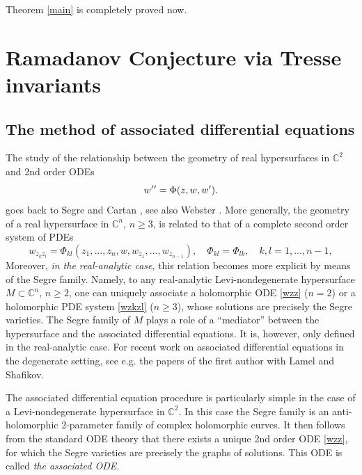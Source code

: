 \documentclass[12pt]{amsart}
\def\CC{\mathbb{C}}
\begin{document}
Theorem \ref{main} is completely proved now.

\section{Ramadanov Conjecture via Tresse invariants}

 \subsection{The method of associated differential equations}
 The study of the relationship between the geometry of 
 real hypersurfaces in $\CC^{2}$ and 2nd order ODEs 
  \begin{equation}\label{wzz}
 w\rq{}\rq{}=\Phi(z,w,w\rq{}).
 \end{equation}
 goes back to Segre \cite{segre}
 and Cartan \cite{cartan},
 see also Webster \cite{webster}.
More generally,  the geometry of a real hypersurface in $\CC^{n},\,n\geq 3$, is related to
 that of a complete second order system of PDEs
\begin{equation}\label{wzkzl}
w_{z_kz_l}=\Phi_{kl}(z_1,...,z_n,w,w_{z_1},...,w_{z_{n-1}}),\quad \Phi_{kl}=\Phi_{lk},\quad k,l=1,...,n-1,
\end{equation}
  Moreover, {\em in the real-analytic case},
  this relation becomes %
more
explicit 
by means of the Segre family.
Namely,
to any real-analytic Levi-nondegenerate hypersurface $M\subset\CC^{n},\,n\geq 2$, one can uniquely associate a holomorphic ODE \eqref{wzz} ($n=2$) or a holomorphic PDE system \eqref{wzkzl} ($n\geq 3$),
whose solutions are precisely the Segre varieties.
The Segre family of $M$ plays a role of a 
``mediator'' between the hypersurface and the associated differential equations.  
It is, however, only defined in the real-analytic case.
For recent work on associated differential equations in the degenerate setting, see e.g. the papers  
  \cite{divergence, nonminimalODE, nonanalytic} of the first author with Lamel and Shafikov.

  The associated differential equation procedure is particularly simple in the case of a Levi-nondegenerate hypersurface in $\CC^{2}$. In this case the Segre family is an
 anti-holomorphic 
 2-parameter family of complex holomorphic curves. 
 It then follows from the standard ODE theory that there exists a unique 2nd order ODE \eqref{wzz}, for which the Segre varieties are precisely the graphs of solutions. This ODE is called \it the associated ODE. \rm
\end{document}
